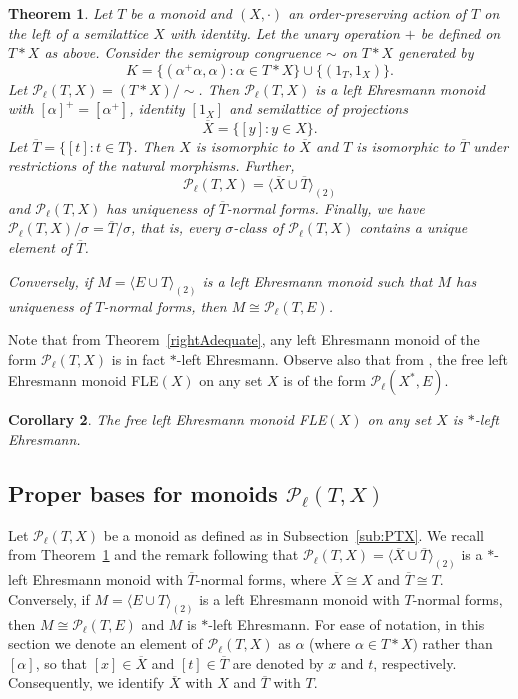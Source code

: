 \documentclass[12pt]{amsart}
\newtheorem{them}{Theorem}[section]
\newtheorem{cor}[them]{Corollary}
\theoremstyle{definition}
\theoremstyle{definition}
\numberwithin{them}{section}
\numberwithin{equation}{section}
\newcommand{\QP}{\mbox{$\mathcal{P}$}}
\begin{document}
{{\begin{them}\cite[Theorem 2.2, Corollary 3.4]{GG}\label{P1} 
Let $T$ be a monoid and $(X,\cdot)$  an order-preserving action of $T$ on the left of a semilattice $X$ with identity. Let the unary operation  ${+}$ be defined on $T * X$ as above. Consider the semigroup congruence $\sim$ on $T * X$ generated by
\[K = \{(\alpha^{+}\alpha, \alpha): \alpha \in T * X\} \cup \{(1_T, 1_X)\}.\]
Let $ \QP_{\ell}(T, X) = (T * X)/\sim$. Then $\QP_{\ell}(T, X)$ is a left Ehresmann monoid with $[\alpha]^{+} = [\alpha^{+}]$, identity $[1_X]$ and semilattice of projections
\[\overline{X} = \{[y]: y \in X\}.\]
Let $\overline{T} = \{[t]: t \in T\}$. Then $X$  is isomorphic to $\overline{X}$ and $T$ is isomorphic to $\overline{T}$ under restrictions of the natural morphisms. Further, 
\[\mathcal{P}_{\ell}(T,X)=\langle \overline{X}\cup\overline{T}\rangle_{(2)}\] and  $\QP_{\ell}(T, X)$ has uniqueness of $\overline{T}$-normal forms. Finally, we have
$\mathcal{P}_{\ell}(T,X)/\sigma=\overline{T}/\sigma$, that is, every $\sigma$-class of $\QP_{\ell}(T, X)$ contains a unique element of $\overline{T}$.

Conversely, if $M=\langle E\cup T\rangle_{(2)}$ is a left Ehresmann monoid  such that $M$ has uniqueness of $T$-normal forms, then $M\cong\mathcal{P}_{\ell}(T,E)$.
\end{them}

Note that from Theorem~\ref{rightAdequate}, any left Ehresmann monoid of the form $\mathcal{P}_{\ell}(T,X)$ is in fact $*$-left Ehresmann. Observe also that from \cite[Theorem 4.5]{GG}, the free left  Ehresmann monoid FLE$(X)$ on any set $X$  is of the form $\mathcal{P}_{\ell}(X^*,E)$. 

\begin{cor}\label{cor:free} The free left  Ehresmann monoid FLE$(X)$ on any set $X$  is $*$-left  Ehresmann.
\end{cor}


\subsection{Proper bases for monoids $\mathcal{P}_{\ell}(T,X)$}\label{sub:PTXagain}  

Let  $\mathcal{P}_{\ell}(T,X)$ be a  monoid as defined as in Subsection~\ref{sub:PTX}. We recall from Theorem~\ref{P1} and the remark following that $\mathcal{P}_{\ell}(T,X)=\langle \overline{X}\cup\overline{T}\rangle_{(2)}$ is a $*$-left Ehresmann monoid with 
$\overline{T}$-normal forms,
 where $\overline{X}\cong X$ and $\overline{T}\cong T$. 
Conversely, if $M=\langle E\cup T\rangle_{(2)}$ is a left Ehresmann monoid with  $T$-normal forms, then $M\cong\mathcal{P}_{\ell}(T,E)$  and  $M$ is $*$-left Ehresmann. For ease of notation, in this section we denote an element of $\mathcal{P}_{\ell}(T,X)$ as $\alpha$  (where $\alpha \in T\ast X)$  rather than $[\alpha]$, so that  $[x]\in \overline{X}$ and $[t]\in \overline{T}$ are denoted by $x$ and $t$, respectively. Consequently, we  identify $\overline{X}$ with $X$ and $\overline{T}$ with $T$.

}}
\end{document}
